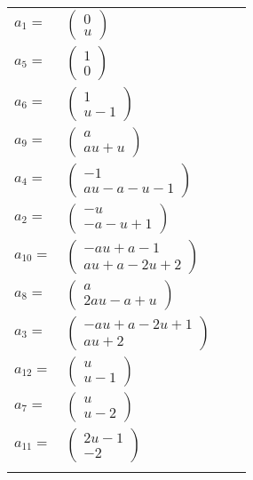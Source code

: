 \documentclass[1p]{elsarticle_modified}
\theoremstyle{definition}
\begin{document}
\begin{tabular}{m{7pt} m{180pt} m{7pt} m{180pt} }
\flushright $a_{1}=$&$\begin{pmatrix}0\\u\end{pmatrix}$ \\
\flushright $a_{5}=$&$\begin{pmatrix}1\\0\end{pmatrix}$ \\
\flushright $a_{6}=$&$\begin{pmatrix}1\\u-1\end{pmatrix}$ \\
\flushright $a_{9}=$&$\begin{pmatrix}a\\a u+u\end{pmatrix}$ \\
\flushright $a_{4}=$&$\begin{pmatrix}-1\\a u- a- u-1\end{pmatrix}$ \\
\flushright $a_{2}=$&$\begin{pmatrix}- u\\- a- u+1\end{pmatrix}$ \\
\flushright $a_{10}=$&$\begin{pmatrix}- a u+a-1\\a u+a-2 u+2\end{pmatrix}$ \\
\flushright $a_{8}=$&$\begin{pmatrix}a\\2 a u- a+u\end{pmatrix}$ \\
\flushright $a_{3}=$&$\begin{pmatrix}- a u+a-2 u+1\\a u+2\end{pmatrix}$ \\
\flushright $a_{12}=$&$\begin{pmatrix}u\\u-1\end{pmatrix}$ \\
\flushright $a_{7}=$&$\begin{pmatrix}u\\u-2\end{pmatrix}$ \\
\flushright $a_{11}=$&$\begin{pmatrix}2 u-1\\-2\end{pmatrix}$\\&\end{tabular}
\end{document}
